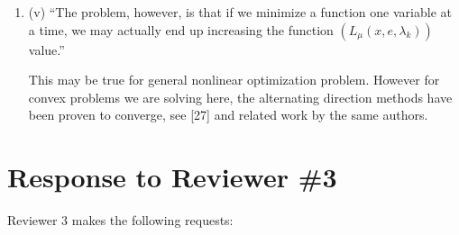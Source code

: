 \documentclass[11pt]{article}
\begin{document}
\begin{enumerate}
\item (v) ``The problem, however, is that if we minimize a function one variable at
a time, we may actually end up increasing the function $(L_{\mu}(x,e,\lambda_{k}))$ value.''

This may be true for general nonlinear optimization problem. However for convex problems
we are solving here, the alternating direction methods have been proven to converge, see
[27] and related work by the same authors. 


\end{enumerate}

\section{Response to Reviewer \#3}
Reviewer 3 makes the following requests:
\end{document}

